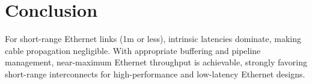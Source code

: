 \documentclass[../HFT-main.tex]{subfiles} %
\begin{document}
\section{Conclusion}

For short-range Ethernet links (1m or less), intrinsic latencies dominate, making cable propagation negligible. With appropriate buffering and pipeline management, near-maximum Ethernet throughput is achievable, strongly favoring short-range interconnects for high-performance and low-latency Ethernet designs.
\end{document}
